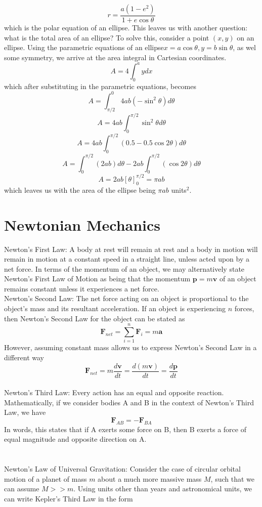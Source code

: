 \documentclass{article}
\begin{document}
$$r=\frac{a(1-e^2)}{1+e\cos\theta}$$
which is the polar equation of an ellipse.
This leaves us with another question: what is the total area of an ellipse? To solve this, consider a point $(x,y)$ on an ellipse. Using the parametric equations of an ellipse$x=a\cos\theta, y=b\sin\theta$, as wel some symmetry, we arrive at the area integral in Cartesian coordinates.
$$A=4\int_{0}^{a}y d{x}$$
which after substituting in the parametric equations, becomes
$$A=\int_{\pi/2}^{0}4ab(-\sin^2\theta)d\theta$$
$$A=4ab\int_{0}^{\pi/2}\sin^2\theta d\theta$$
$$A=4ab\int_{0}^{\pi/2}(0.5-0.5\cos2\theta)d\theta$$
$$A=\int_{0}^{\pi/2}(2ab)d\theta-2ab\int_{0}^{\pi/2}(\cos2\theta )d\theta$$
$$A=2ab[\theta]_{0}^{\pi/2}=\pi ab$$
which leaves us with the area of the ellipse being $\pi ab$ units$^2$.

\section{Newtonian Mechanics}
Newton's First Law: A body at rest will remain at rest and a body in motion will remain in motion at a constant speed in a straight line, unless acted upon by a net force. In terms of the momentum of an object, we may alternatively state Newton's First Law of Motion as being that the momentum $\textbf{p}=m\textbf{v}$ of an object remains constant unless it experiences a net force.
\\
Newton's Second Law: The net force acting on an object is proportional to the object's mass and its resultant acceleration. If an object is experiencing $n$ forces, then Newton's Second Law for the object can be stated as
$$\textbf{F}_{net}=\sum_{i=1}^{n}\textbf{F}_{i}=m\textbf{a}$$
However, assuming constant mass allows us to express Newton's Second Law in a different way
$$\textbf{F}_{net}=m\frac{d\textbf{v}}{dt}=\frac{d(m\textbf{v})}{dt}=\frac{d\textbf{p}}{dt}$$
\\
Newton's Third Law: Every action has an equal and opposite reaction. Mathematically, if we consider bodies A and B in the context of Newton's Third Law, we have
$$\textbf{F}_{AB}=-\textbf{F}_{BA}$$
In words, this states that if A exerts some force on B, then B exerts a force of equal magnitude and opposite direction on A. 
\\
\\
\\
Newton's Law of Universal Gravitation: Consider the case of circular orbital motion of a planet of mass $m$ about a much more massive mass $M$, such that we can assume $M>>m$. Using units other than years and astronomical units, we can write Kepler's Third Law in the form
\end{document}
